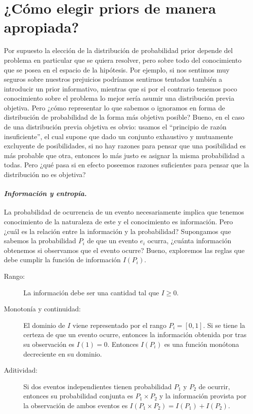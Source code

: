 \documentclass[a4paper,twoside]{article}
\begin{document}
\section{¿Cómo elegir priors de manera apropiada?}
%
Por supuesto la elección de la distribución de probabilidad prior depende del problema en particular
que se quiera resolver, pero sobre todo del conocimiento que se posea en el espacio de la hipótesis.
Por ejemplo, si nos sentimos muy seguros sobre nuestros prejuicios podríamos sentirnos tentados
también a introducir un prior informativo, mientras que si por el contrario tenemos poco
conocimiento sobre el problema lo mejor sería asumir una distribución previa objetiva. Pero ¿cómo
representar lo que sabemos o ignoramos en forma de distribución de probabilidad de la forma más
objetiva posible? Bueno, en el caso de una distribución previa objetiva es obvio: usamos el
``principio de razón insuficiente'', el cual supone que dado un conjunto exhaustivo y mutuamente
excluyente de posibilidades, si no hay razones para pensar que una posibilidad es más probable que
otra, entonces lo más justo es asignar la misma probabilidad a todas. Pero ¿qué pasa si en efecto
poseemos razones suficientes para pensar que la distribución no es objetiva?

\paragraph{\textit{\color{teal}Información y entropía.}} La probabilidad de ocurrencia de un evento
necesariamente implica que tenemos conocimiento de la naturaleza de este y el conocimiento es
información. Pero ¿cuál es la relación entre la información y la probabilidad? Supongamos que
sabemos la probabilidad $P_i$ de que un evento $e_i$ ocurra, ¿cuánta información obtenemos si
observamos que el evento ocurre? Bueno, exploremos las reglas que debe cumplir la función de
información $I(P_i)$.
%
\begin{description}
%
\item[Rango:] La información debe ser una cantidad tal que $I\geq0$.
%
\item[Monotonía y continuidad:] El dominio de $I$ viene representado por el rango $P_i=[0,1]$. Si se
tiene la certeza de que un evento ocurre, entonces la información obtenida por tras su observación
es $I(1)=0$. Entonces $I(P_i)$ es una función monótona decreciente en su dominio.
%
\item[Aditividad:] Si dos eventos independientes tienen probabilidad $P_1$ y $P_2$ de ocurrir,
entonces su probabilidad conjunta es $P_1\times P_2$ y la información provista por la observación de
ambos eventos es $I(P_1\times P_2) = I(P_1) + I(P_2)$.
%
\end{description}
\end{document}
